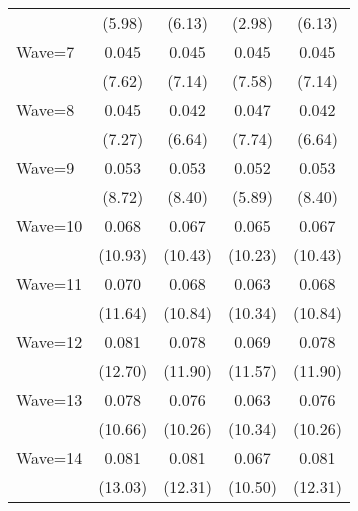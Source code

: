 {\begin{tabular}{l*{4}{c}}
                    &      (5.98)         &      (6.13)         &      (2.98)         &      (6.13)         \\
[1em]
Wave=7              &       0.045\sym{***}&       0.045\sym{***}&       0.045\sym{***}&       0.045\sym{***}\\
                    &      (7.62)         &      (7.14)         &      (7.58)         &      (7.14)         \\
[1em]
Wave=8              &       0.045\sym{***}&       0.042\sym{***}&       0.047\sym{***}&       0.042\sym{***}\\
                    &      (7.27)         &      (6.64)         &      (7.74)         &      (6.64)         \\
[1em]
Wave=9              &       0.053\sym{***}&       0.053\sym{***}&       0.052\sym{***}&       0.053\sym{***}\\
                    &      (8.72)         &      (8.40)         &      (5.89)         &      (8.40)         \\
[1em]
Wave=10             &       0.068\sym{***}&       0.067\sym{***}&       0.065\sym{***}&       0.067\sym{***}\\
                    &     (10.93)         &     (10.43)         &     (10.23)         &     (10.43)         \\
[1em]
Wave=11             &       0.070\sym{***}&       0.068\sym{***}&       0.063\sym{***}&       0.068\sym{***}\\
                    &     (11.64)         &     (10.84)         &     (10.34)         &     (10.84)         \\
[1em]
Wave=12             &       0.081\sym{***}&       0.078\sym{***}&       0.069\sym{***}&       0.078\sym{***}\\
                    &     (12.70)         &     (11.90)         &     (11.57)         &     (11.90)         \\
[1em]
Wave=13             &       0.078\sym{***}&       0.076\sym{***}&       0.063\sym{***}&       0.076\sym{***}\\
                    &     (10.66)         &     (10.26)         &     (10.34)         &     (10.26)         \\
[1em]
Wave=14             &       0.081\sym{***}&       0.081\sym{***}&       0.067\sym{***}&       0.081\sym{***}\\
                    &     (13.03)         &     (12.31)         &     (10.50)         &     (12.31)         \\

\end{tabular}}
